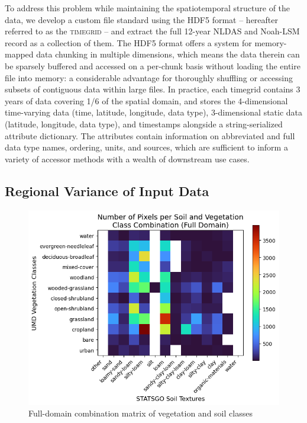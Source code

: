 To address this problem while maintaining the spatiotemporal structure of the data, we develop a custom file standard using the HDF5 format -- hereafter referred to as the \textsc{timegrid} -- and extract the full 12-year NLDAS and Noah-LSM record as a collection of them. The HDF5 format offers a system for memory-mapped data chunking in multiple dimensions, which means the data therein can be sparsely buffered and accessed on a per-chunk basis without loading the entire file into memory: a considerable advantage for thoroughly shuffling or accessing subsets of contiguous data within large files. In practice, each timegrid contains 3 years of data covering 1/6 of the spatial domain, and stores the 4-dimensional time-varying data (time, latitude, longitude, data type), 3-dimensional static data (latitude, longitude, data type), and timestamps alongside a string-serialized attribute dictionary. The attributes contain information on abbreviated and full data type names, ordering, units, and sources, which are sufficient to inform a variety of accessor methods with a wealth of downstream use cases.

\subsection{Regional Variance of Input Data}

\begin{figure}[h!]
    \centering
    \includegraphics[width=.75\linewidth,draft=false]{figures/static_soil-veg-combos.png}
    \caption{Full-domain combination matrix of vegetation and soil classes}
    \label{static-combos}
\end{figure}

